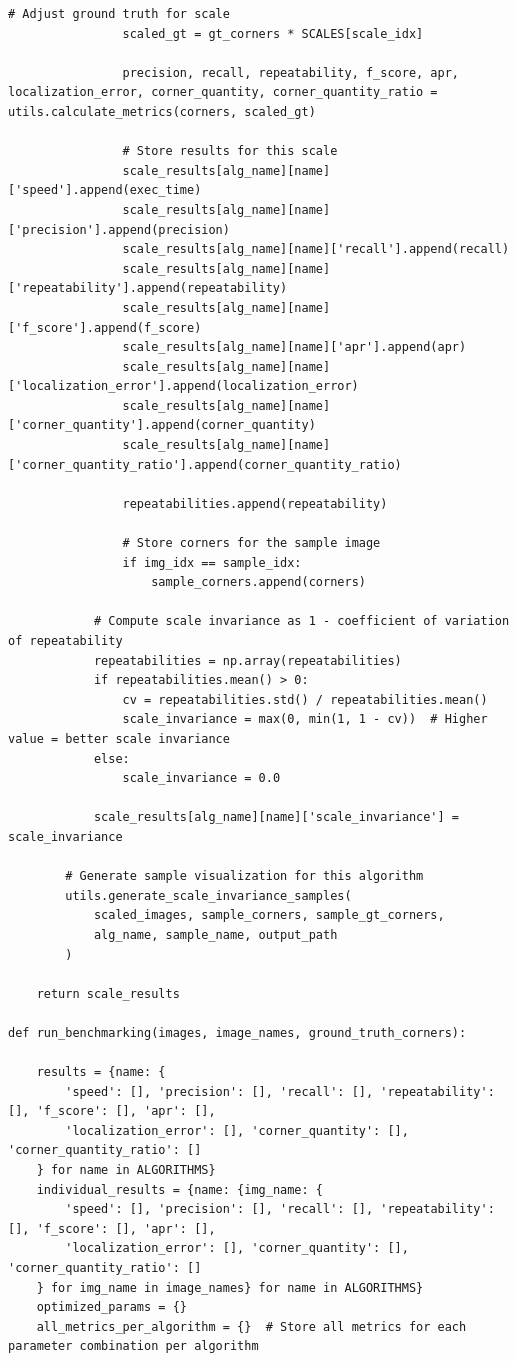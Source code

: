 \documentclass[journal]{IEEEtran}
\begin{document}
\begin{lstlisting}[style=python, caption={Driver Script for Project}, label={lst:driver}]
                # Adjust ground truth for scale
                scaled_gt = gt_corners * SCALES[scale_idx]
                
                precision, recall, repeatability, f_score, apr, localization_error, corner_quantity, corner_quantity_ratio = utils.calculate_metrics(corners, scaled_gt)
                
                # Store results for this scale
                scale_results[alg_name][name]['speed'].append(exec_time)
                scale_results[alg_name][name]['precision'].append(precision)
                scale_results[alg_name][name]['recall'].append(recall)
                scale_results[alg_name][name]['repeatability'].append(repeatability)
                scale_results[alg_name][name]['f_score'].append(f_score)
                scale_results[alg_name][name]['apr'].append(apr)
                scale_results[alg_name][name]['localization_error'].append(localization_error)
                scale_results[alg_name][name]['corner_quantity'].append(corner_quantity)
                scale_results[alg_name][name]['corner_quantity_ratio'].append(corner_quantity_ratio)
                
                repeatabilities.append(repeatability)
                
                # Store corners for the sample image
                if img_idx == sample_idx:
                    sample_corners.append(corners)
            
            # Compute scale invariance as 1 - coefficient of variation of repeatability
            repeatabilities = np.array(repeatabilities)
            if repeatabilities.mean() > 0:
                cv = repeatabilities.std() / repeatabilities.mean()
                scale_invariance = max(0, min(1, 1 - cv))  # Higher value = better scale invariance
            else:
                scale_invariance = 0.0
            
            scale_results[alg_name][name]['scale_invariance'] = scale_invariance
        
        # Generate sample visualization for this algorithm
        utils.generate_scale_invariance_samples(
            scaled_images, sample_corners, sample_gt_corners, 
            alg_name, sample_name, output_path
        )
    
    return scale_results

def run_benchmarking(images, image_names, ground_truth_corners):

    results = {name: {
        'speed': [], 'precision': [], 'recall': [], 'repeatability': [], 'f_score': [], 'apr': [],
        'localization_error': [], 'corner_quantity': [], 'corner_quantity_ratio': []
    } for name in ALGORITHMS}
    individual_results = {name: {img_name: {
        'speed': [], 'precision': [], 'recall': [], 'repeatability': [], 'f_score': [], 'apr': [],
        'localization_error': [], 'corner_quantity': [], 'corner_quantity_ratio': []
    } for img_name in image_names} for name in ALGORITHMS}
    optimized_params = {}
    all_metrics_per_algorithm = {}  # Store all metrics for each parameter combination per algorithm
    

\end{lstlisting}
\end{document}
